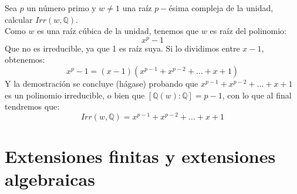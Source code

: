\begin{ejercicio} %
    Sea $p$ un número primo y $w\neq 1$ una raíz $p-$ésima compleja de la unidad, calcular $Irr(w,\mathbb{Q})$.\\

    \noindent
    Como $w$ es una raíz cúbica de la unidad, tenemos que $w$ es raíz del polinomio:
    \begin{equation*}
        x^p - 1
    \end{equation*}
    Que no es irreducible, ya que 1 es raíz suya. Si lo dividimos entre $x-1$, obtenemos:
    \begin{equation*}
        x^p-1 = (x-1)(x^{p-1} + x^{p-2} + \ldots + x + 1)
    \end{equation*}
    Y la demostración se concluye (hágase) probando que $x^{p-1}+x^{p-2}+\ldots+x+1$ es un polinomio irreducible, o bien que $[\mathbb{Q}(w) : \mathbb{Q}] = p-1$, con lo que al final tendremos que:
    \begin{equation*}
        Irr(w,\mathbb{Q}) = x^{p-1}+x^{p-2}+\ldots+x+1
    \end{equation*}
\end{ejercicio}

\section{Extensiones finitas y extensiones algebraicas}

